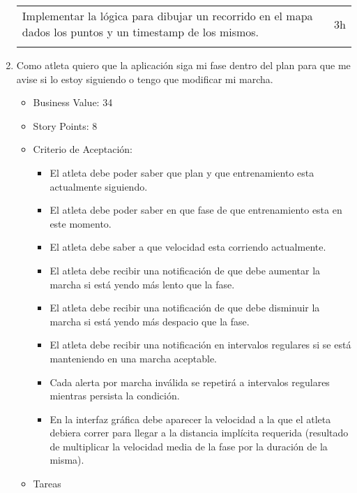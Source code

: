 \begin{enumerate}
\begin{longtable}[c]{@{}ll@{}}
\begin{minipage}[t]{0.92\columnwidth}
  Implementar la lógica para dibujar un recorrido en el mapa dados los
  puntos y un timestamp de los mismos.
  \end{minipage} & \begin{minipage}[t]{0.08\columnwidth}\raggedright
  3h
  \end{minipage}
  \\\noalign{\medskip}
  \hline
  \end{longtable}
\item
  Como atleta quiero que la aplicación siga mi fase dentro del plan para
  que me avise si lo estoy siguiendo o tengo que modificar mi marcha.

  \begin{itemize}
  \item
    Business Value: 34
  \item
    Story Points: 8
  \item
    Criterio de Aceptación:

    \begin{itemize}
    \itemsep1pt\parskip0pt
    \item
      El atleta debe poder saber que plan y que entrenamiento esta
      actualmente siguiendo.
    \item
      El atleta debe poder saber en que fase de que entrenamiento esta
      en este momento.
    \item
      El atleta debe saber a que velocidad esta corriendo actualmente.
    \item
      El atleta debe recibir una notificación de que debe aumentar la
      marcha si está yendo más lento que la fase.
    \item
      El atleta debe recibir una notificación de que debe disminuir la
      marcha si está yendo más despacio que la fase.
    \item
      El atleta debe recibir una notificación en intervalos regulares si
      se está manteniendo en una marcha aceptable.
    \item
      Cada alerta por marcha inválida se repetirá a intervalos regulares
      mientras persista la condición.
    \item
      En la interfaz gráfica debe aparecer la velocidad a la que el
      atleta debiera correr para llegar a la distancia implícita
      requerida (resultado de multiplicar la velocidad media de la fase
      por la duración de la misma).
    \end{itemize}
  \item
    Tareas
  \end{itemize}


\end{enumerate}
